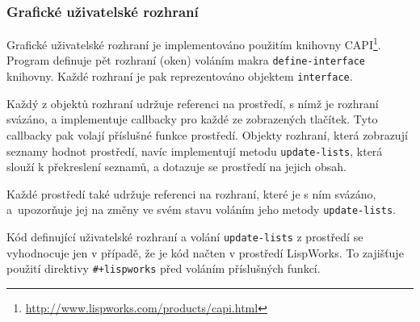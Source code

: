 \subsubsection{Grafické uživatelské rozhraní}
Grafické uživatelské rozhraní je implementováno použitím knihovny
CAPI\footnote{\url{http://www.lispworks.com/products/capi.html}}. Program
definuje pět rozhraní (oken) voláním makra \verb|define-interface| knihovny.
Každé rozhraní je pak reprezentováno objektem \verb|interface|.

Každý z objektů rozhraní udržuje referenci na prostředí, s nímž je rozhraní
svázáno, a implementuje callbacky pro každé ze zobrazených tlačítek. Tyto
callbacky pak volají příslušné funkce prostředí. Objekty rozhraní, která
zobrazují seznamy hodnot prostředí, navíc implementují metodu
\verb|update-lists|, která slouží k překreslení seznamů, a dotazuje se prostředí
na jejich obsah.

Každé prostředí také udržuje referenci na rozhraní, které je s ním svázáno,
a~upozorňuje jej na změny ve svém stavu voláním jeho metody \verb|update-lists|.

Kód definující uživatelské rozhraní a volání \verb|update-lists| z prostředí se
vyhodnocuje jen v případě, že je kód načten v prostředí LispWorks. To zajišťuje
použití direktivy \verb|#+lispworks| před voláním příslušných funkcí.
